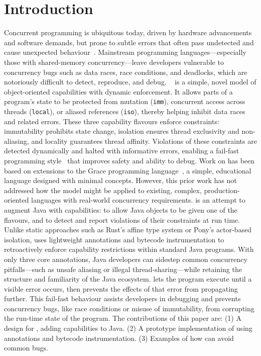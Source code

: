\section{Introduction}
%
Concurrent programming is ubiquitous today, driven by hardware advancements and software demands, but prone to subtle errors that often pass undetected and cause unexpected behaviour~\cite{lu2008learning,musuvathi2008finding,lin2015jacontebe}. Mainstream programming languages—especially those with shared-memory concurrency—leave developers vulnerable to concurrency bugs such as data races, race conditions, and deadlocks, which are notoriously difficult to detect, reproduce, and debug.
%
\dala~\cite{Dala_Paper,DafnyExperience-Noble2024} is a simple, novel model of object-oriented capabilities with dynamic enforcement. It allows parts of a program’s state to be protected from mutation (\texttt{imm}), concurrent access across threads (\texttt{local}), or aliased references (\texttt{iso}), thereby helping inhibit data races and related errors. These three capability flavours enforce constraints: immutability prohibits state change, isolation ensures thread exclusivity and non-aliasing, and locality guarantees thread affinity. Violations of these constraints are detected dynamically and halted with informative errors, enabling a fail-fast programming style~\cite{shore2004fail} that improves safety and ability to debug.
%
Work on \dala has been based on extensions to the Grace programming language~\cite{GraceAbsence-Black2012}, a simple, educational language designed with minimal concepts. However, this prior work has not addressed how the model might be applied to existing, complex, production-oriented languages with real-world concurrency requirements.
%
\jdala is an attempt to augment Java with \dala capabilities: to allow Java objects to be given one of the \dala flavours, and to detect and report violations of their constraints at run time. Unlike static approaches such as Rust’s affine type system or Pony’s actor-based isolation, \jdala uses lightweight annotations and bytecode instrumentation to retroactively enforce capability restrictions within standard Java programs. With only three core annotations, Java developers can sidestep common concurrency pitfalls—such as unsafe aliasing or illegal thread-sharing—while retaining the structure and familiarity of the Java ecosystem.
%
%
\jdala lets the program execute until a visible error occurs, then prevents the effects of that error from propagating further. This fail-fast behaviour assists developers in debugging and prevents concurrency bugs, like race conditions or misuse of immutability, from corrupting the run-time state of the program.
%
The contributions of this paper are: 
(1) A design for \jdala, adding \dala capabilities to Java.
(2) A prototype implementation of \jdala using annotations and bytecode instrumentation.
(3) Examples of how \jdala can avoid common bugs.
